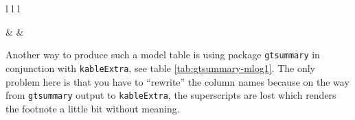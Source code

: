 \documentclass[
  11pt,
  a4paper,
  twoside]{scrbook}
\begin{document}
\begin{table}[ht]
\begin{centerbox}
\begin{threeparttable}
\begin{tabular}{l l l}
\hhline{}

 &
 &
 \tabularnewline[-0.5pt]



 \tabularnewline[-0.5pt]


\hhline{}
\end{tabular}
\end{threeparttable}\par\end{centerbox}

\end{table}
 

Another way to produce such a model table is using package \texttt{gtsummary} in conjunction with \texttt{kableExtra}, see table \ref{tab:gtsummary-mlog1}. The only problem here is that you have to ``rewrite'' the column names because on the way from \texttt{gtsummary} output to \texttt{kableExtra}, the superscripts are lost which renders the footnote a little bit without meaning.

\linespread{1}
\end{document}
